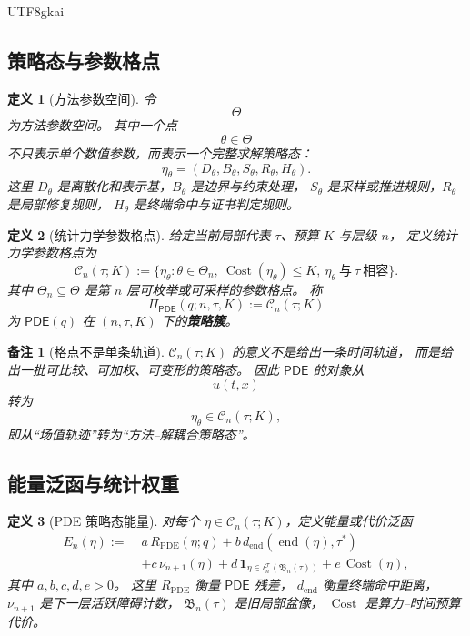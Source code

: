 \documentclass[12pt]{article}
\newtheorem{definition}{定义}[section]
\newtheorem{remark}{备注}[section]
\newcommand{\PDE}{\mathsf{PDE}}
\newcommand{\Cost}{\operatorname{Cost}}
\newcommand{\Endp}{\operatorname{end}}
\newcommand{\ResPDE}{R_{\mathrm{PDE}}}
\begin{document}
\begin{CJK*}{UTF8}{gkai}
\subsection{策略态与参数格点}
\label{subsec:tex53-strategy-state}

\begin{definition}[方法参数空间]
令
\[
  \Theta
\]
为方法参数空间。
其中一个点
\[
  \theta\in\Theta
\]
不只表示单个数值参数，而表示一个完整求解策略态：
\[
  \eta_\theta
  =
  (D_\theta,B_\theta,S_\theta,R_\theta,H_\theta).
\]
这里 \(D_\theta\) 是离散化和表示基，\(B_\theta\) 是边界与约束处理，
\(S_\theta\) 是采样或推进规则，\(R_\theta\) 是局部修复规则，
\(H_\theta\) 是终端命中与证书判定规则。
\end{definition}

\begin{definition}[统计力学参数格点]
给定当前局部代表 \(\tau\)、预算 \(K\) 与层级 \(n\)，
定义统计力学参数格点为
\[
  \mathcal C_n(\tau;K)
  :=
  \{
    \eta_\theta:
    \theta\in\Theta_n,\ 
    \Cost(\eta_\theta)\le K,\ 
    \eta_\theta\ \text{与}\ \tau\ \text{相容}
  \}.
\]
其中 \(\Theta_n\subseteq\Theta\) 是第 \(n\) 层可枚举或可采样的参数格点。
称
\[
  \Pi_{\PDE}(q;n,\tau,K):=\mathcal C_n(\tau;K)
\]
为 \(\PDE(q)\) 在 \((n,\tau,K)\) 下的\textbf{策略簇}。
\end{definition}

\begin{remark}[格点不是单条轨道]
\(\mathcal C_n(\tau;K)\) 的意义不是给出一条时间轨道，
而是给出一批可比较、可加权、可变形的策略态。
因此 \(\PDE\) 的对象从
\[
  u(t,x)
\]
转为
\[
  \eta_\theta\in \mathcal C_n(\tau;K),
\]
即从“场值轨迹”转为“方法--解耦合策略态”。
\end{remark}

\subsection{能量泛函与统计权重}
\label{subsec:tex53-energy}

\begin{definition}[PDE 策略态能量]
对每个 \(\eta\in\mathcal C_n(\tau;K)\)，定义能量或代价泛函
\[
\begin{aligned}
  E_n(\eta)
  :=\;&
  a\,\ResPDE(\eta;q)
  + b\,d_{\mathrm{end}}(\Endp(\eta),\tau^\ast)\\
  &+ c\,\nu_{n+1}(\eta)
  + d\,\mathbf 1_{\eta\in\iota_n^{\mathcal T}(\mathfrak B_n(\tau))}
  + e\,\Cost(\eta),
\end{aligned}
\]
其中 \(a,b,c,d,e>0\)。
这里 \(\ResPDE\) 衡量 \(\PDE\) 残差，
\(d_{\mathrm{end}}\) 衡量终端命中距离，
\(\nu_{n+1}\) 是下一层活跃障碍计数，
\(\mathfrak B_n(\tau)\) 是旧局部盆像，
\(\Cost\) 是算力--时间预算代价。
\end{definition}


\end{CJK*}
\end{document}
